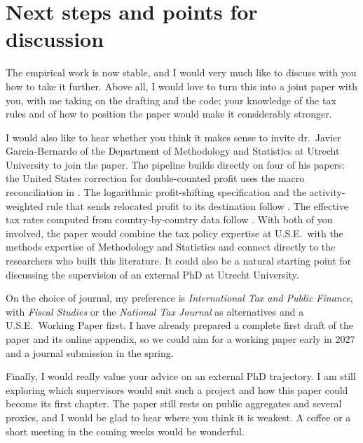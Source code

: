 \documentclass[11pt,a4paper]{article}
\begin{document}
\section{Next steps and points for discussion}

The empirical work is now stable, and I would very much like to discuss with you how to take it further. Above all, I would love to turn this into a joint paper with you, with me taking on the drafting and the code; your knowledge of the tax rules and of how to position the paper would make it considerably stronger.

I would also like to hear whether you think it makes sense to invite dr.\ Javier Garcia-Bernardo of the Department of Methodology and Statistics at Utrecht University to join the paper. The pipeline builds directly on four of his papers: the United States correction for double-counted profit uses the macro reconciliation in \citet{garcia-bernardo2022a}. The logarithmic profit-shifting specification and the activity-weighted rule that sends relocated profit to its destination follow \citet{garcia-bernardo2024}. The effective tax rates computed from country-by-country data follow \citet{garcia-bernardo2021,garcia-bernardo2023}. With both of you involved, the paper would combine the tax policy expertise at U.S.E.\ with the methods expertise of Methodology and Statistics and connect directly to the researchers who built this literature. It could also be a natural starting point for discussing the supervision of an external PhD at Utrecht University.

On the choice of journal, my preference is \emph{International Tax and Public Finance}, with \emph{Fiscal Studies} or the \emph{National Tax Journal} as alternatives and a U.S.E.\ Working Paper first. I have already prepared a complete first draft of the paper and its online appendix, so we could aim for a working paper early in 2027 and a journal submission in the spring.

Finally, I would really value your advice on an external PhD trajectory. I am still exploring which supervisors would suit such a project and how this paper could become its first chapter. The paper still rests on public aggregates and several proxies, and I would be glad to hear where you think it is weakest. A coffee or a short meeting in the coming weeks would be wonderful.
\end{document}
